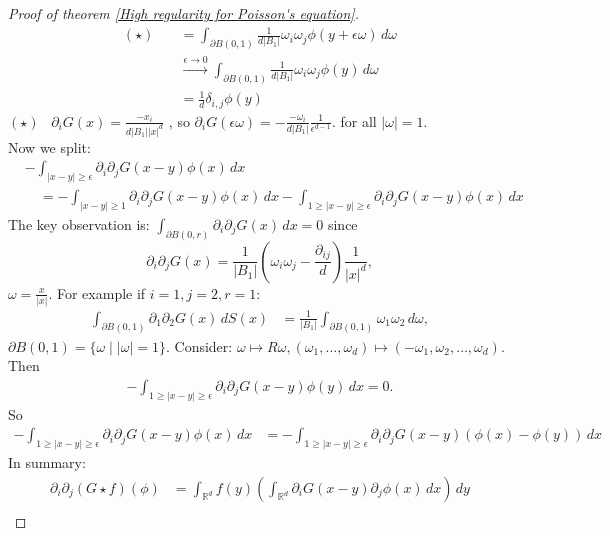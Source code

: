 \documentclass{report}
\theoremstyle{tommy}
\begin{document}
\begin{proof}[Proof of theorem \ref{High regularity for Poisson's equation}]
\begin{align*}
      (\star) \quad &= \int_{\partial B(0, 1)} \frac{1}{d|B_1|} \omega_i \omega_j \phi(y + \epsilon \omega) \, d \omega \\
      &\xrightarrow{\epsilon \to 0} \int_{\partial B(0, 1)} \frac{1}{d|B_1|} \omega_i \omega_j \phi(y) \, d\omega \\
      &= \frac{1}{d} \delta_{i,j} \phi(y)
    \end{align*}
    \((\star)\) \ \(\partial_i G(x) = \frac{- x_i}{d|B_1||x|^d}\)
    , so \(\partial_i G(\epsilon \omega) = - \frac{- \omega_i}{d |B_1|} \frac{1}{\epsilon^{d-1}}.\) for all \(|\omega| = 1\). \\
    
    Now we split:
    \begin{align*}
      &- \int_{|x-y| \ge \epsilon} \partial_i \partial_j G(x-y) \phi(x) \, dx \\
      &\quad= - \int_{|x-y| \ge 1}  \partial_i \partial_j G(x-y) \phi(x) \, dx - \int_{1 \ge |x-y| \ge \epsilon}  \partial_i \partial_j G(x-y) \phi(x) \, dx
    \end{align*}
    The key observation is: \(\int_{\partial B(0, r)} \partial_i \partial_j G(x) \, dx = 0\) since \[\partial_i \partial_j G(x) = \frac{1}{|B_1|}\left(\omega_i \omega_j - \frac{\partial_{ij}}{d}\right) \frac{1}{|x|^d},\] \(\omega = \frac{x}{|x|}\). For example if \(i = 1, j = 2, r = 1\):
    \begin{align*}
      \int_{\partial B(0, 1)} \partial_1 \partial_2 G(x) \, dS(x) 
      &= \frac{1}{|B_1|} \int_{\partial B(0, 1)} \omega_1 \omega_2 \, d \omega,
    \end{align*}
    \(\partial B(0,1) = \{\omega \mid |\omega| = 1\}\). Consider: \(\omega \mapsto R \omega, (\omega_1, \dots, \omega_d) \mapsto (- \omega_1, \omega_2, \dots, \omega_d)\). Then
    \begin{align*}
      -\int_{1 \ge |x-y| \ge \epsilon} \partial_i \partial_j G(x-y) \phi(y) \, dx = 0.
    \end{align*}
    So 
    \begin{align*}
      - \int_{1 \ge |x-y| \ge \epsilon} \partial_i \partial_j G(x-y) \phi(x) \, dx &= - \int_{1 \ge |x-y|\ge \epsilon} \partial_i \partial_j G(x-y) (\phi(x) - \phi(y)) \, dx
    \end{align*}
    In summary:
    \begin{align*}
      \partial_i \partial_j (G \star f)(\phi)
      &= \int_{\mathbb{R}^d} f(y) \left(\int_{\mathbb{R}^d} \partial_i G(x-y) \partial_j \phi(x) \, dx\right) \, dy \\

\end{align*}
\end{proof}
\end{document}
